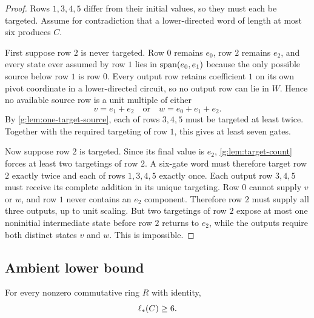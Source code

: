 \begin{proof}
Rows $1,3,4,5$ differ from their initial values, so they must each be targeted.  Assume for contradiction that a lower-directed word of length at most six produces $C$.

First suppose row $2$ is never targeted.  Row $0$ remains $e_0$, row $2$ remains $e_2$, and every state ever assumed by row $1$ lies in $\operatorname{span}(e_0,e_1)$ because the only possible source below row $1$ is row $0$.  Every output row retains coefficient $1$ on its own pivot coordinate in a lower-directed circuit, so no output row can lie in $W$.  Hence no available source row is a unit multiple of either
\[
v=e_1+e_2
\quad\text{or}\quad
w=e_0+e_1+e_2.
\]
By \cref{g:lem:one-target-source}, each of rows $3,4,5$ must be targeted at least twice.  Together with the required targeting of row $1$, this gives at least seven gates.

Now suppose row $2$ is targeted.  Since its final value is $e_2$, \cref{g:lem:target-count} forces at least two targetings of row $2$.  A six-gate word must therefore target row $2$ exactly twice and each of rows $1,3,4,5$ exactly once.  Each output row $3,4,5$ must receive its complete addition in its unique targeting.  Row $0$ cannot supply $v$ or $w$, and row $1$ never contains an $e_2$ component.  Therefore row $2$ must supply all three outputs, up to unit scaling.  But two targetings of row $2$ expose at most one noninitial intermediate state before row $2$ returns to $e_2$, while the outputs require both distinct states $v$ and $w$.  This is impossible.
\end{proof}

\subsection{Ambient lower bound}

\begin{proposition}\label{g:prop:ambient-lower-bound}
For every nonzero commutative ring $R$ with identity,
\[
\ell_{*}(C)\ge6.
\]
\end{proposition}


